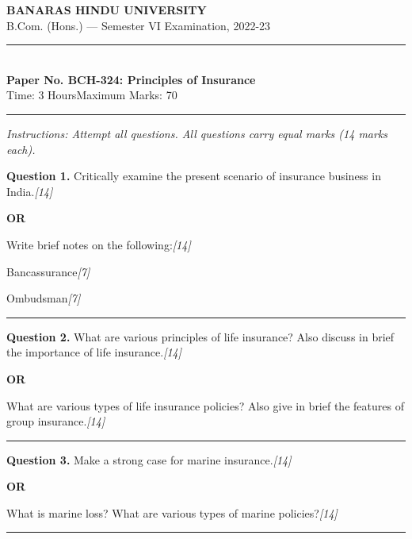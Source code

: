 \documentclass[11pt,a4paper]{article}
\newcommand{\pts}[1]{\hfill   \textit{[#1]}}
\begin{document}
\begin{center}
  {\large\bfseries BANARAS HINDU UNIVERSITY}\\[2pt]
  {\normalsize B.Com. (Hons.) --- Semester VI Examination, 2022-23}\\[6pt]
  \rule{0.8\linewidth}{0.5pt}\\[6pt]
  {\large\bfseries Paper No. BCH-324: Principles of Insurance}\\[4pt]
  {\normalsize Time: 3 Hours\hfill Maximum Marks: 70}
\end{center}

\rule{\linewidth}{0.4pt}

\smallskip



\noindent   \textit{Instructions: Attempt all questions. All questions carry equal marks (14 marks each).}

\bigskip




\noindent   \textbf{Question 1.}
Critically examine the present scenario of insurance business in India.\pts{14}

\centerline{   \textbf{OR}}

Write brief notes on the following:\pts{14}

\begin{parts}
  \item Bancassurance\pts{7}
  \item Ombudsman\pts{7}
\end{parts}

\medskip\rule{\linewidth}{0.2pt}




\noindent   \textbf{Question 2.}
What are various principles of life insurance? Also discuss in brief the importance of life insurance.\pts{14}

\centerline{   \textbf{OR}}

What are various types of life insurance policies? Also give in brief the features of group insurance.\pts{14}

\medskip\rule{\linewidth}{0.2pt}




\noindent   \textbf{Question 3.}
Make a strong case for marine insurance.\pts{14}

\centerline{   \textbf{OR}}

What is marine loss? What are various types of marine policies?\pts{14}

\medskip\rule{\linewidth}{0.2pt}
\end{document}
